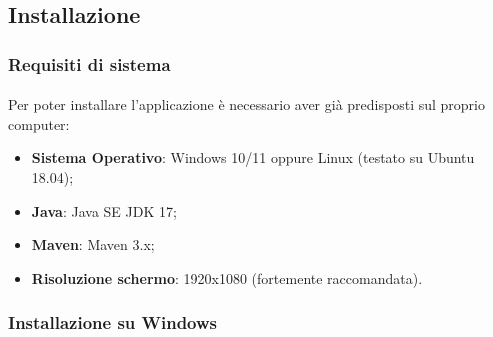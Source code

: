 \documentclass[a4paper, 12pt]{article}
\begin{document}
	\subsection{Installazione}
	\subsubsection{Requisiti di sistema}
	\paragraph{}
	Per poter installare l'applicazione è necessario aver già predisposti sul proprio computer:
	\begin{itemize}
		\item \textbf{Sistema Operativo}: Windows 10/11 oppure Linux (testato su Ubuntu 18.04);
		\item \textbf{Java}: Java SE JDK 17;
		\item \textbf{Maven}: Maven 3.x;
		\item \textbf{Risoluzione schermo}: 1920x1080 (fortemente raccomandata).
	\end{itemize}
	\subsubsection{Installazione su Windows}
\end{document}
